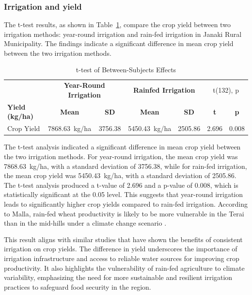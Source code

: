 \subsubsection{Irrigation and yield}


The t-test results, as shown in Table~\ref{tab:t_test_irrigation}, compare the crop yield between two irrigation methods: year-round irrigation and rain-fed irrigation in Janaki Rural Municipality. The findings indicate a significant difference in mean crop yield between the two irrigation methods.

\begin{table}[htbp]
    \centering
    \caption{t-test of Between-Subjects Effects}
    \label{tab:t_test_irrigation}
    \begin{tabular}{@{}l c c c c c c@{}}
        \toprule
        & \multicolumn{2}{c}{\textbf{Year-Round Irrigation}} & \multicolumn{2}{c}{\textbf{Rainfed Irrigation}} & \multicolumn{2}{c}{t(132), p} \\
        \cmidrule(lr){2-3} \cmidrule(lr){4-5}
        \textbf{Yield (kg/ha)} & \textbf{Mean} & \textbf{SD} & \textbf{Mean} & \textbf{SD} & \textbf{t} & \textbf{p} \\
        \midrule
        Crop Yield & 7868.63~kg/ha & 3756.38 & 5450.43~kg/ha & 2505.86 & 2.696 & 0.008 \\
        \bottomrule
    \end{tabular}
\end{table}

The t-test analysis indicated a significant difference in mean crop yield between the two irrigation methods. For year-round irrigation, the mean crop yield was 7868.63~kg/ha, with a standard deviation of 3756.38, while for rain-fed irrigation, the mean crop yield was 5450.43~kg/ha, with a standard deviation of 2505.86. The t-test analysis produced a t-value of 2.696 and a p-value of 0.008, which is statistically significant at the 0.05 level. This suggests that year-round irrigation leads to significantly higher crop yields compared to rain-fed irrigation. According to Malla, rain-fed wheat productivity is likely to be more vulnerable in the Terai than in the mid-hills under a climate change scenario \citep{mallaClimateChangeIts2009}.

This result aligns with similar studies that have shown the benefits of consistent irrigation on crop yields. The difference in yield underscores the importance of irrigation infrastructure and access to reliable water sources for improving crop productivity. It also highlights the vulnerability of rain-fed agriculture to climate variability, emphasizing the need for more sustainable and resilient irrigation practices to safeguard food security in the region.


